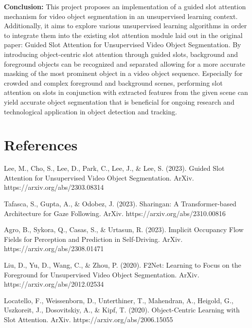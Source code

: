 \documentclass{article}
\theoremstyle{plain}
\theoremstyle{definition}
\theoremstyle{remark}
\begin{document}
\textbf{Conclusion: }
This project proposes an implementation of a guided slot attention mechanism for video object segmentation in an unsupervised learning context. Additionally, it aims to explore various unsupervised learning algorithms in order to integrate them into the existing slot attention module laid out in the original paper: Guided Slot Attention for Unsupervised Video Object Segmentation. By introducing object-centric slot attention through guided slots, background and foreground objects can be recognized and separated allowing for a more accurate masking of the most prominent object in a video object sequence.  Especially for crowded and complex foreground and background scenes, performing slot attention on slots in conjunction with extracted features from the given scene can yield accurate object segmentation that is beneficial for ongoing research and technological application in object detection and tracking.

\section*{References}


Lee, M., Cho, S., Lee, D., Park, C., Lee, J., \& Lee, S. (2023). Guided Slot Attention for Unsupervised Video Object Segmentation. ArXiv. https://arxiv.org/abs/2303.08314

Tafasca, S., Gupta, A., \& Odobez, J. (2023). Sharingan: A Transformer-based Architecture for Gaze Following. ArXiv. https://arxiv.org/abs/2310.00816

Agro, B., Sykora, Q., Casas, S., \& Urtasun, R. (2023). Implicit Occupancy Flow Fields for Perception and Prediction in Self-Driving. ArXiv. https://arxiv.org/abs/2308.01471

Liu, D., Yu, D., Wang, C., \& Zhou, P. (2020). F2Net: Learning to Focus on the Foreground for Unsupervised Video Object Segmentation. ArXiv. https://arxiv.org/abs/2012.02534

Locatello, F., Weissenborn, D., Unterthiner, T., Mahendran, A., Heigold, G., Uszkoreit, J., Dosovitskiy, A., \& Kipf, T. (2020). Object-Centric Learning with Slot Attention. ArXiv. https://arxiv.org/abs/2006.15055
\end{document}
